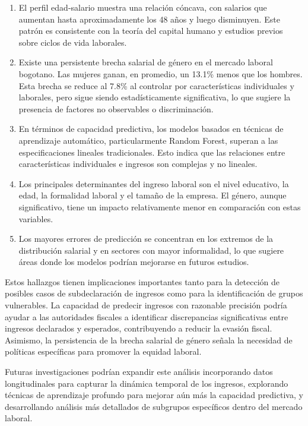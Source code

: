 \documentclass[12pt,a4paper,onecolumn]{article}
\begin{document}
\begin{enumerate}
    \item El perfil edad-salario muestra una relación cóncava, con salarios que aumentan hasta aproximadamente los 48 años y luego disminuyen. Este patrón es consistente con la teoría del capital humano y estudios previos sobre ciclos de vida laborales.

    \item Existe una persistente brecha salarial de género en el mercado laboral bogotano. Las mujeres ganan, en promedio, un 13.1\% menos que los hombres. Esta brecha se reduce al 7.8\% al controlar por características individuales y laborales, pero sigue siendo estadísticamente significativa, lo que sugiere la presencia de factores no observables o discriminación.

    \item En términos de capacidad predictiva, los modelos basados en técnicas de aprendizaje automático, particularmente Random Forest, superan a las especificaciones lineales tradicionales. Esto indica que las relaciones entre características individuales e ingresos son complejas y no lineales.

    \item Los principales determinantes del ingreso laboral son el nivel educativo, la edad, la formalidad laboral y el tamaño de la empresa. El género, aunque significativo, tiene un impacto relativamente menor en comparación con estas variables.

    \item Los mayores errores de predicción se concentran en los extremos de la distribución salarial y en sectores con mayor informalidad, lo que sugiere áreas donde los modelos podrían mejorarse en futuros estudios.
\end{enumerate}

Estos hallazgos tienen implicaciones importantes tanto para la detección de posibles casos de subdeclaración de ingresos como para la identificación de grupos vulnerables. La capacidad de predecir ingresos con razonable precisión podría ayudar a las autoridades fiscales a identificar discrepancias significativas entre ingresos declarados y esperados, contribuyendo a reducir la evasión fiscal. Asimismo, la persistencia de la brecha salarial de género señala la necesidad de políticas específicas para promover la equidad laboral.

Futuras investigaciones podrían expandir este análisis incorporando datos longitudinales para capturar la dinámica temporal de los ingresos, explorando técnicas de aprendizaje profundo para mejorar aún más la capacidad predictiva, y desarrollando análisis más detallados de subgrupos específicos dentro del mercado laboral.

\pagebreak
\singlespacing
\nocite{*}


\end{document}
